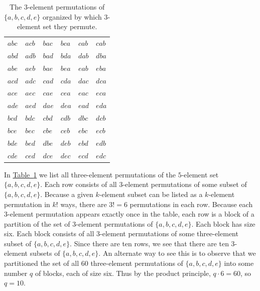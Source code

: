 \documentclass[10pt,]{book}
\theoremstyle{plain}
\theoremstyle{definition}
\theoremstyle{definition}
\numberwithin{equation}{chapter}
\begin{document}
\begin{table}
\centering
\begin{tabular}{llllll}
\(abc\)&\(acb\)&\(bac\)&\(bca\)&\(cab\)&\(cab\)\tabularnewline[0pt]
\(abd\)&\(adb\)&\(bad\)&\(bda\)&\(dab\)&\(dba\)\tabularnewline[0pt]
\(abe\)&\(aeb\)&\(bae\)&\(bea\)&\(eab\)&\(eba\)\tabularnewline[0pt]
\(acd\)&\(adc\)&\(cad\)&\(cda\)&\(dac\)&\(dca\)\tabularnewline[0pt]
\(ace\)&\(aec\)&\(cae\)&\(cea\)&\(eac\)&\(eca\)\tabularnewline[0pt]
\(ade\)&\(aed\)&\(dae\)&\(dea\)&\(ead\)&\(eda\)\tabularnewline[0pt]
\(bcd\)&\(bdc\)&\(cbd\)&\(cdb\)&\(dbc\)&\(dcb\)\tabularnewline[0pt]
\(bce\)&\(bec\)&\(cbe\)&\(ceb\)&\(ebc\)&\(ecb\)\tabularnewline[0pt]
\(bde\)&\(bed\)&\(dbe\)&\(deb\)&\(ebd\)&\(edb\)\tabularnewline[0pt]
\(cde\)&\(ced\)&\(dce\)&\(dec\)&\(ecd\)&\(edc\)
\end{tabular}
\caption{The \(3\)-element permutations of \(\{a,b,c,d,e\}\) organized by which \(3\)-element set they permute.\label{tab_permsof3}}
\end{table}
In \hyperref[tab_permsof3]{Table~\ref{tab_permsof3}} we list all three-element permutations of the \(5\)-element set \(\{a,b,c,d,e\}\). Each row consists of all \(3\)-element permutations of some subset of \(\{a,b,c,d,e\}\). Because a given \(k\)-element subset can be listed as a \(k\)-element permutation in \(k!\) ways, there are \(3!=6\) permutations in each row. Because each \(3\)-element permutation appears exactly once in the table, each row is a block of a partition of the set of \(3\)-element permutations of \(\{a,b,c,d,e\}\). Each block has size six. Each block consists of all \(3\)-element permutations of some three-element subset of \(\{a,b,c,d,e\}\). Since there are ten rows, we see that there are ten \(3\)-element subsets of \(\{a,b,c,d,e\}\). An alternate way to see this is to observe that we partitioned the set of all \(60\) three-element permutations of \(\{a,b,c,d,e\}\) into some number \(q\) of blocks, each of size six. Thus by the product principle, \(q\cdot 6=60\), so \(q=10\).%
\end{document}
